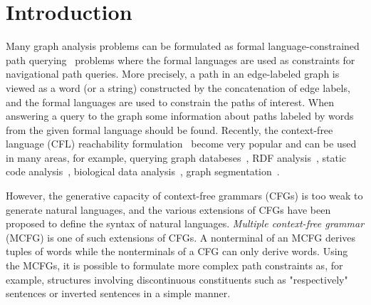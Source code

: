 \section{Introduction}

Many graph analysis problems can be formulated as formal language-constrained path querying~\cite{doi:10.1137/S0097539798337716} problems where the formal languages are used as constraints for
navigational path queries. More precisely, a path in an edge-labeled graph is viewed as a word (or a string) constructed by the concatenation of edge labels, and the formal languages are used to constrain the paths of interest. When answering a query to the graph some information about paths labeled by words from the given formal language should be found. Recently, the context-free language (CFL) reachability formulation~\cite{reps1998program} become very popular and can be used in many areas, for example, querying graph databeses~\cite{10.1145/3398682.3399163}, RDF analysis~\cite{10.1007/978-3-319-46523-4_38}, static code analysis~\cite{Zheng,10.1145/373243.360208}, biological data analysis~\cite{SubgraphQueriesbyContextfreeGrammars}, graph segmentation~\cite{8731467}.

However, the generative capacity of context-free grammars (CFGs) is too weak to generate natural languages, and the various extensions of CFGs have been proposed to define the syntax of natural languages. \textit{Multiple context-free grammar} (MCFG) is one of such extensions of CFGs. A nonterminal of an MCFG derives tuples of words while the nonterminals of a CFG can only derive words. Using the MCFGs, it is possible to formulate more complex path constraints as, for example, structures involving discontinuous constituents such as "respectively" sentences or inverted sentences in a simple manner.

